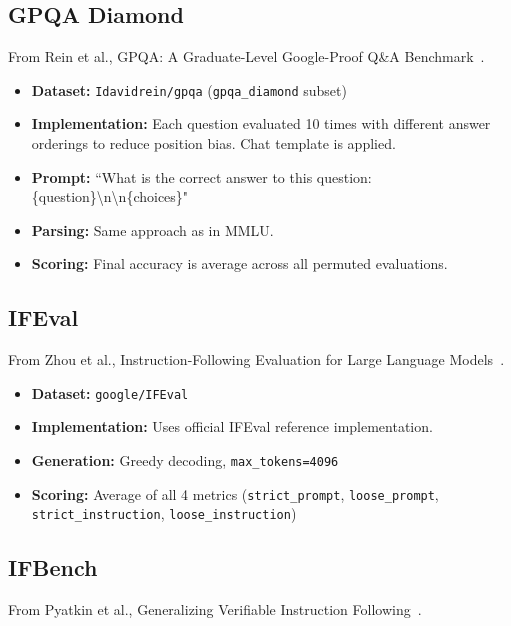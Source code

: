\documentclass{article}
\begin{document}
\subsection*{GPQA Diamond}

From Rein et al., GPQA: A Graduate-Level Google-Proof Q\&A Benchmark~\citep{rein2023gpqa}.

\begin{itemize}
    \item \textbf{Dataset:} \texttt{Idavidrein/gpqa} (\texttt{gpqa\_diamond} subset)
    \item \textbf{Implementation:} Each question evaluated 10 times with different answer orderings to reduce position bias. Chat template is applied.
    \item \textbf{Prompt:} ``What is the correct answer to this question: \{question\}\textbackslash n\textbackslash n\{choices\}"
    \item \textbf{Parsing:} Same approach as in MMLU.
    \item \textbf{Scoring:} Final accuracy is average across all permuted evaluations.
\end{itemize}

\subsection*{IFEval}

From Zhou et al., Instruction-Following Evaluation for Large Language Models~\citep{zhou2023ifeval}.

\begin{itemize}
    \item \textbf{Dataset:} \texttt{google/IFEval}
    \item \textbf{Implementation:} Uses official IFEval reference implementation.
    \item \textbf{Generation:} Greedy decoding, \texttt{max\_tokens=4096}
    \item \textbf{Scoring:} Average of all 4 metrics (\texttt{strict\_prompt}, \texttt{loose\_prompt}, \texttt{strict\_instruction}, \texttt{loose\_instruction})
\end{itemize}

\subsection*{IFBench}

From Pyatkin et al., Generalizing Verifiable Instruction Following~\citep{pyatkin2025ifbench}.
\end{document}
